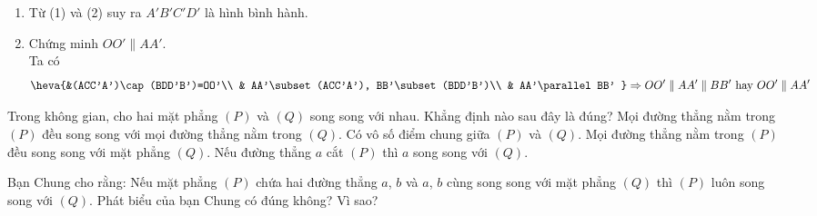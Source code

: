 \begin{ex}
{\begin{enumerate}
   Ta có $\heva{&{mp}(A A',BB')\parallel{mp}(CC',DD')\\ &(Q)\cap{mp}(AA',BB')=A'B'\\ &(Q)\cap{mp}(CC',DD')=C'D'}\Rightarrow A'B'\parallel  C'D'$.\quad (1)\\
   Hoàn toàn tương tự, ta chứng  minh được $A'D'\parallel B'C'$.\quad (2)
   \item Từ (1) và (2)  suy ra $A'B'C'D'$ là hình bình hành.
   \item Chứng  minh $O O'\parallel A A'$. \\
   Ta  có
    $$\heva{&(ACC'A')\cap(BDD'B')=OO'\\ &
   AA'\subset(ACC'A'), BB'\subset(BDD'B')\\  &
   AA'\parallel  BB'
   }\Rightarrow OO'\parallel AA'\parallel BB'\text{  hay }OO'\parallel AA'$$
  \end{enumerate}
  }
\end{ex}

\begin{ex}%
	Trong không gian, cho hai mặt phẳng $(P)$ và $(Q)$ song song với nhau. Khẳng định nào sau đây là đúng?
	\choice
	{Mọi đường thẳng nằm trong $(P)$ đều song song với mọi đường thẳng nằm trong $(Q)$.}
	{Có vô số điểm chung giữa $(P)$ và $(Q)$.}
	{\True Mọi đường thẳng nằm trong $(P)$ đều song song với mặt phẳng $(Q)$.}
	{Nếu đường thẳng $a$ cắt $(P)$ thì $a$ song song với $(Q)$.}
\end{ex}


\begin{bt}%
	Bạn Chung cho rằng:  Nếu mặt phẳng $(P)$ chứa hai đường thẳng $a$, $b$ và $a$, $b$ cùng song song với mặt phẳng $(Q)$ thì $(P)$ luôn song song với $(Q)$. Phát biểu của bạn Chung có đúng không? Vì sao?
\end{bt}

